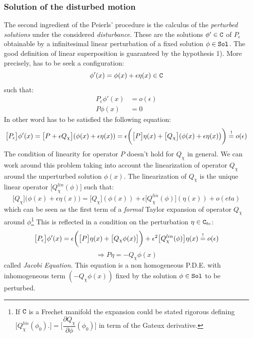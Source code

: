 \documentclass[Main]{subfiles}
\begin{document}
	\subsubsection{Solution of the disturbed motion}
		The second ingredient of the Peierls' procedure is the calculus of the \emph{perturbed solutions} under the considered \emph{disturbance}.
		 These are the solutions $\phi'\in \mathtt{C}$ of $P_\epsilon$ obtainable by a infinitesimal linear perturbation of a fixed solution $\phi \in \mathtt{Sol}$. The good definition of linear superposition is guaranteed by the hypothesis 1).
		More precisely, has to be seek a configuration:
			\begin{displaymath}
					\phi'(x) = \phi(x) + \epsilon \eta(x) \in \mathtt{C}
			\end{displaymath}
		such that:
			\begin{align*} 
				P_\epsilon \phi'(x) &= o(\epsilon)  \\ 
				P \phi(x) &= 0
			\end{align*}
		In other word has to be satisfied the following equation:
		\begin{displaymath}
			\big[P_\epsilon\big] \phi'(x) = \big[ P + \epsilon Q_\chi		\big]( \phi(x) + \epsilon \eta(x)) 
			= \epsilon \biggr( \big[P\big] \eta(x) + \big[Q_\chi \big]( \phi(x) + \epsilon \eta(x)\big)\biggr) \overset{!}{=} o(\epsilon)			
		\end{displaymath}
		The condition of linearity for operator $P$ doesn't hold for $Q_\chi$ in general.
		We can work around this problem taking into account the linearization\cite[pag. 31]{Khavkine2014} of operator $Q_\chi$ around the unperturbed solution $\phi(x)$. 
		The linearization of $Q_\chi$ is the unique linear operator $\big[Q_\chi^{lin}(\phi) \big]$ such that:
		\begin{displaymath}
			\big[Q_\chi \big]( \phi(x) + \epsilon \eta(x)\big)= \big[Q_\chi \big]( \phi(x)) + \epsilon \big[Q_\chi^{lin}(\phi)  \big]( \eta(x)) + o(eta)
		\end{displaymath}
		which can be seen as the first term of a \emph{formal} Taylor expansion of operator $Q_\chi$ around $\phi$\footnote{If $\mathtt{C}$ is a Frechet manifold the expansion could be stated rigorous defining $\big[Q_\chi^{lin}(\phi_0) . \big] = \big[\dfrac{\partial Q_\chi}{\partial \phi} (\phi_0)\big] $ in term of the Gateux derivative.}
		This is reflected in a condition on the perturbation $\eta \in \mathtt{C}_{tc}$:
		\begin{displaymath}
			\big[P_\epsilon\big] \phi'(x) =  \epsilon \biggr( \big[P\big] \eta(x) + \big[Q_\chi \phi(x) \big]\biggr)+ \epsilon^2 \big[Q_\chi^{lin}(\phi)  \big]	\eta(x) \overset{!}{=} o(\epsilon)
		\end{displaymath}
		\begin{equation}\label{PeierlJacobiEqLin}
			\Rightarrow P \eta = - Q_\chi \phi(x)
		\end{equation}
		called \emph{Jacobi Equation}.
		This equation is a non homogeneous P.D.E. with inhomogeneous term $ (- Q_\chi \phi(x))$ fixed by the solution $\phi\in \mathtt{Sol}$ to be perturbed.
\end{document}
